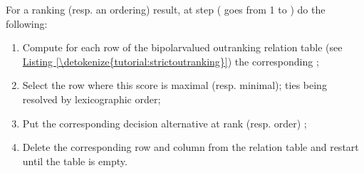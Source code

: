 \documentclass[a4paper,12pt,english]{sphinxhowto}
\begin{document}
For a ranking (resp. an ordering) result, at step  ( goes from 1 to ) do the following:
\begin{enumerate}
%
\item {} 
Compute for each row of the bipolar\sphinxhyphen{}valued outranking relation table (see \hyperref[\detokenize{tutorial:strictoutranking}]{Listing \ref{\detokenize{tutorial:strictoutranking}}}) the corresponding {\hyperref[\detokenize{tutorial:netflows-ranking-label}]{}} ;

\item {} 
Select the row where this score is maximal (resp. minimal); ties being resolved by lexicographic order;

\item {} 
Put the corresponding decision alternative at rank (resp. order) ;

\item {} 
Delete the corresponding row and column from the relation table and restart until the table is empty.

\end{enumerate}
\end{document}
